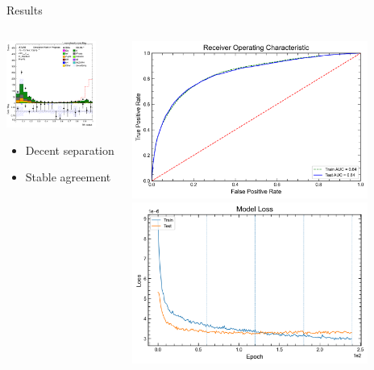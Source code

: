 \begin{frame}{Results}
    \begin{columns}
        \begin{column}{0.5\textwidth}
          \includegraphics[width=0.82\textwidth]{response_binary}
          \begin{itemize}
            \item Decent separation
            \item Stable agreement
          \end{itemize}
        \end{column}
        \begin{column}{0.5\textwidth}
          \includegraphics[width=0.84\textwidth]{ROC_binary}
          \includegraphics[width=0.84\textwidth]{loss_binary}

\end{column}
\end{columns}
\end{frame}
